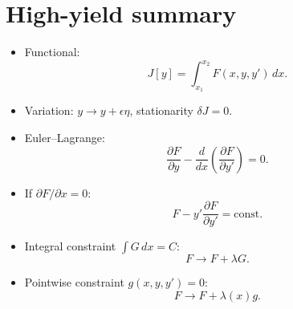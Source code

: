 
\section{High-yield summary}

\begin{itemize}
\item Functional:
\[
J[y]=\int_{x_1}^{x_2}F(x,y,y')\,dx.
\]
\item Variation: $y\to y+\epsilon\eta$, stationarity $\delta J=0$.
\item Euler--Lagrange:
\[
\frac{\partial F}{\partial y}
-\frac{d}{dx}\left(\frac{\partial F}{\partial y'}\right)=0.
\]
\item If $\partial F/\partial x=0$:
\[
F-y'\frac{\partial F}{\partial y'}=\text{const}.
\]
\item Integral constraint $\int G\,dx=C$:
\[
F\to F+\lambda G.
\]
\item Pointwise constraint $g(x,y,y')=0$:
\[
F\to F+\lambda(x)g.
\]
\end{itemize}
